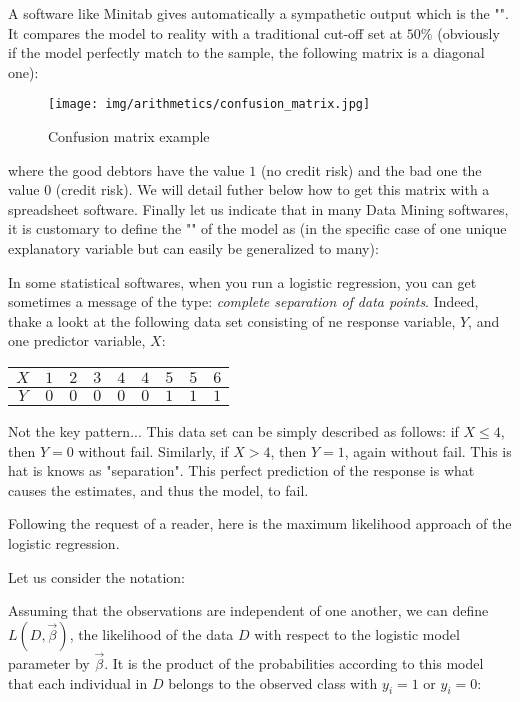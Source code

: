 	A software like Minitab gives automatically a sympathetic output which is the "". It compares the model to reality with a traditional cut-off set at $50\%$ (obviously if the model perfectly match to the sample, the following matrix is a diagonal one):
	\begin{figure}[H]
		\centering
		\texttt{[image: img/arithmetics/confusion\_matrix.jpg]}
		\caption{Confusion matrix example}
	\end{figure}
	where the good debtors have the value $1$ (no credit risk) and the bad one the value $0$ (credit risk). We will detail futher below how to get this matrix with a spreadsheet software. Finally let us indicate that in many Data Mining softwares, it is customary to define the "" of the model as (in the specific case of one unique explanatory variable but can easily be generalized to many):
	
	\begin{tcolorbox}[title=Remark,colframe=black,arc=10pt]
	In some statistical softwares, when you run a logistic regression, you can get sometimes a message of the type: \textit{complete separation of data points}. Indeed, thake a lookt at the following data set consisting of ne response variable, $Y$, and one predictor variable, $X$:
	\begin{table}[H]
		\begin{center}
			\begin{tabular}{|c|c|c|c|c|c|c|c|c|}
			\hline
			$X$ & $1$ & $2$ & $3$ & $4$ & $4$ & $5$ & $5$ & $6$ \\ \hline
			$Y$ & $0$ & $0$ & $0$ & $0$ & $0$ & $1$ & $1$ & $1$ \\ \hline
			\end{tabular}
		\end{center}
	\end{table}
	Not the key pattern... This data set can be simply described as follows: if $X\leq 4$, then $Y=0$ without fail. Similarly, if $X>4$, then $Y=1$, again without fail. This is hat is knows as "separation". This perfect prediction of the response is what causes the estimates, and thus the model, to fail.
	\end{tcolorbox}
	Following the request of a reader, here is the maximum likelihood approach of the logistic regression.

	Let us consider the notation:
	
	Assuming that the observations are independent of one another, we can define $L(D,\vec{\beta})$, the likelihood of the data $D$ with respect to the logistic model parameter by $\vec{\beta}$. It is the product of the probabilities according to this model that each individual in $D$ belongs to the observed class with $y_i=1$ or $y_i=0$:
	
